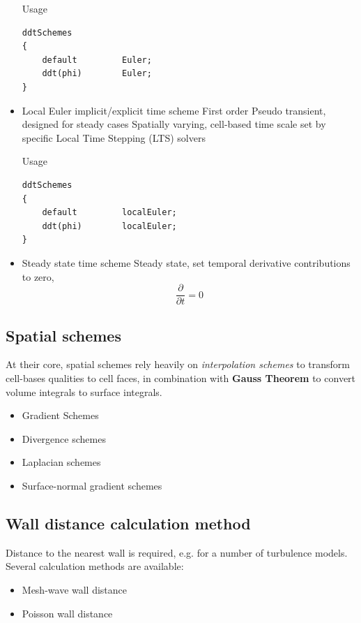 \documentclass{article}
\begin{document}
\begin{itemize}
Usage

\begin{verbatim}
ddtSchemes
{
    default         Euler;
    ddt(phi)        Euler;
}
\end{verbatim}


\item Local Euler implicit/explicit time scheme
First order
Pseudo transient, designed for steady cases
Spatially varying, cell-based time scale set by specific Local Time Stepping (LTS) solvers

Usage

\begin{verbatim}
ddtSchemes
{
    default         localEuler;
    ddt(phi)        localEuler;
}
\end{verbatim}

\item Steady state time scheme
Steady state, set temporal derivative contributions to zero, 
\begin{equation}
\frac{\partial}{\partial t} = 0
\end{equation}
\end{itemize}

\subsection{Spatial schemes}

At their core, spatial schemes rely heavily on \textit{interpolation schemes} to transform cell-bases qualities to cell faces, in combination with \textbf{Gauss Theorem} to convert volume integrals to surface integrals.

\begin{itemize}
\item Gradient Schemes
\item Divergence schemes
\item Laplacian schemes
\item Surface-normal gradient schemes
\end{itemize}

\subsection{Wall distance calculation method}

Distance to the nearest wall is required, e.g. for a number of turbulence models. Several calculation methods are available:
\begin{itemize}
\item Mesh-wave wall distance
\item Poisson wall distance 
\end{itemize}
\end{document}
